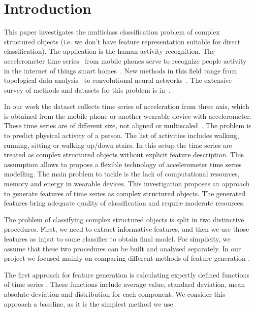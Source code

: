\documentclass{llncs}
\begin{document}
\section{Introduction}
This paper investigates the multiclass classification problem of complex structured objects (i.e. we don't have feature representation suitable for direct classification). The application is the human activity recognition. 
The accelerometer time series~\cite{ignatov2016human,lu2016towards,wang2014human} from mobile phones serve to recognize people activity in the internet of things smart homes~\cite{budnik2016learned,lu2016activity}.
New methods in this field range from topological data analysis~\cite{umeda2017time} to convolutional neural networks~\cite{hammerla2016deep}. 
The extensive survey of methods and datasets for this problem is in~\cite{incel2013review}. 

In our work the dataset collects time series of acceleration from three axis, which is obtained from the mobile phone or another wearable device with accelerometer. 
These time series are of different size, not aligned or multiscaled~\cite{geurts2001pattern}.
The problem is to predict physical activity of a person. 
The list of activities includes walking, running, sitting or walking up/down stairs.
In this setup the time series are treated as complex structured objects without explicit feature description. 
This assumption allows to propose a flexible technology of accelerometer time series modelling. 
The main problem to tackle is the lack of computational resources, memory and energy in wearable devices. This investigation proposes an approach to generate features of time series as complex structured objects. The generated features bring adequate quality of classification and require moderate resources.

The problem of classifying complex structured objects is split in two distinctive procedures. 
First, we need to extract informative features, and then we use those features as input to some classifier to obtain final model. 
For simplicity, we assume that these two procedures can be built and analysed separately. 
In our project we focused mainly on comparing different methods of feature generation \cite{karasikov2016feature,ivkin2015ts}. 

The first approach for feature generation is calculating expertly defined functions of time series \cite{kwapisz2011activity}. 
These functions include average value, standard deviation, mean absolute deviation and distribution for each component. 
We consider this approach a baseline, as it is the simplest method we use.
\end{document}
